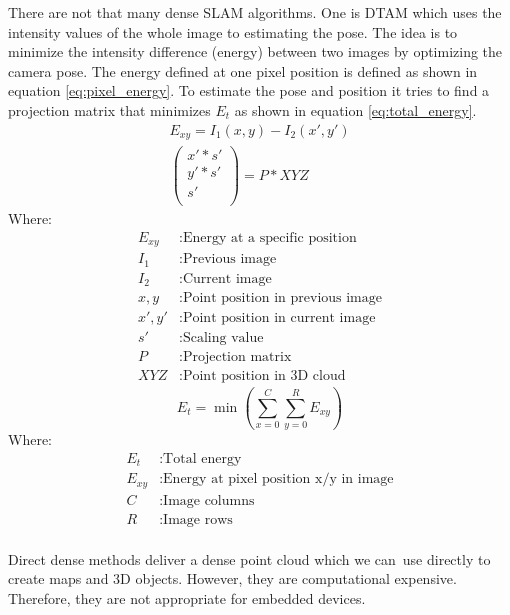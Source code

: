 \documentclass[11pt,a4paper,titlepage,oneside]{report}
\begin{document}
There are not that many dense SLAM algorithms. One is DTAM \cite{dtam} which uses the intensity values of the whole image to estimating the pose. The idea is to minimize the intensity difference (energy) between two images by optimizing the camera pose. The energy defined at one pixel position is defined as shown in equation \ref{eq:pixel_energy}. To estimate the pose and position it tries to find a projection matrix that minimizes $E_{t}$ as shown in equation \ref{eq:total_energy}.
\begin{equation}\label{eq:pixel_energy}
\begin{aligned}
  E_{xy}=I_1(x,y)-I_2(x',y')\\
  \begin{pmatrix}
  x'*s'\\
  y'*s'\\
  s'\\
  \end{pmatrix}=P*XYZ
\end{aligned}
\end{equation}
Where:
\begin{align*}
  E_{xy}  &: \text{Energy at a specific position}\\
  I_1      &: \text{Previous image}\\
  I_2      &: \text{Current image}\\
  x,y      &: \text{Point position in previous image} \\
  x',y'    &: \text{Point position in current image} \\
  s'      &: \text{Scaling value}\\
  P        &: \text{Projection matrix}\\
  XYZ      &: \text{Point position in 3D cloud}
\end{align*}
\begin{equation}\label{eq:total_energy}
  E_{t}=\min(\sum_{x=0}^C\sum_{y=0}^RE_{xy})
\end{equation}
Where:
\begin{align*}
  E_{t}    &: \text{Total energy}\\
  E_{xy}  &: \text{Energy at pixel position x/y in image}\\
  C        &: \text{Image columns}\\
  R        &: \text{Image rows}\\
\end{align*}

Direct dense methods deliver a dense point cloud which we can use directly to create maps and 3D objects. However, they are computational expensive. Therefore, they are not appropriate for embedded devices.
\end{document}
